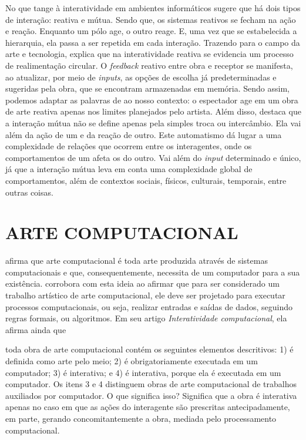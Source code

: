 No que tange à interatividade em ambientes informáticos  sugere que há dois tipos de interação: reativa e mútua. Sendo que,  os sistemas reativos se fecham na ação e reação. Enquanto um pólo age, o outro reage. E, uma vez que se estabelecida a hierarquia, ela passa a ser repetida em cada interação. Trazendo para o campo da arte e tecnologia,  explica que na interatividade reativa se evidencia um processo de realimentação circular. O \textit{feedback} reativo entre obra e receptor se manifesta, ao atualizar, por meio de \textit{inputs}, as opções de escolha já predeterminadas e sugeridas pela obra, que se encontram armazenadas em memória. Sendo assim, podemos adaptar as palavras de  ao nosso contexto: o espectador age em um obra de arte reativa apenas nos limites planejados pelo artista. Além disso,  destaca que a interação mútua não se define apenas pela simples troca ou intercâmbio. Ela vai além da ação de um e da reação de outro. Este automatismo dá lugar a uma complexidade de relações que ocorrem entre os interagentes, onde os comportamentos de um afeta os do outro. Vai além do \textit{input} determinado e único, já que a interação mútua leva em conta uma complexidade global de comportamentos, além de contextos sociais, físicos, culturais, temporais, entre outras coisas.


\section{ARTE COMPUTACIONAL}

 afirma que arte computacional é toda arte produzida através de sistemas  computacionais e que, consequentemente, necessita de um computador para a sua existência.  corrobora com esta ideia ao afirmar que para ser considerado um trabalho artístico de arte computacional, ele deve ser projetado para executar processos computacionais, ou seja, realizar entradas e saídas de dados, seguindo regras formais, ou algoritmos. Em seu artigo \textit{Interatividade computacional}, ela afirma ainda que

\begin{citacao}
toda obra de arte computacional contém os seguintes elementos descritivos: 1) é definida como arte pelo meio; 2) é obrigatoriamente executada em um computador; 3) é interativa; e 4) é interativa, porque ela é executada em um computador. Os itens 3 e 4 distinguem obras de arte computacional de trabalhos auxiliados por computador. O que significa isso? Significa que a obra é interativa apenas no caso em que as ações do interagente são prescritas antecipadamente, em parte, gerando concomitantemente a obra, mediada pelo processamento computacional.  \cite[p. 133]{venturelli}
\end{citacao}

